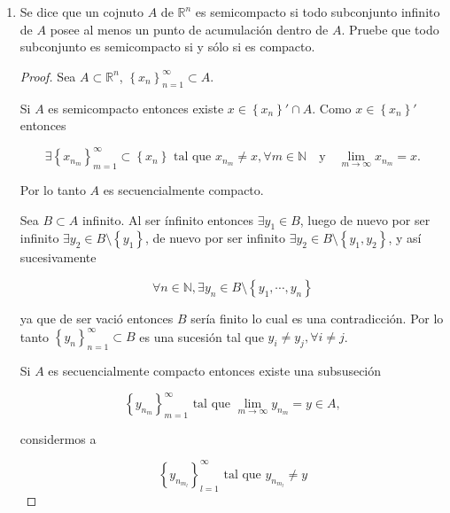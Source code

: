 \documentclass[letterpaper]{article}
\theoremstyle{definition}
\theoremstyle{lemathm}
\theoremstyle{lemathm}
\theoremstyle{lemathm}
\theoremstyle{lemademthm}
\newcommand{\limtoinf}[1]{\lim_{#1\to\infty}}
\newcommand{\Txty}{\quad\text{y}\quad}
\newcommand{\pars}[1]{\left( #1 \right) }
\newcommand{\norm}[1]{\left\lVert#1\right\rVert}
\newcommand{\set}[1]{\left \{ #1 \right\} }
\newcommand{\NN}{\mathbb{N}}
\newcommand{\RR}{\mathbb{R}}
\newcommand{\1}{\mathbbm{1}}
\begin{document}
\begin{enumerate}
\begin{proof}
			Si $y \in \bigcap_{n=1}^{\infty} \overline{B}\pars{x_n,r_n}, y\neq x$ entonces $\norm{y-x} > 0$. Como $\limtoinf{n} r_n = 0$ entonces $\exists n\in N$ tal que $\norm{x-y} > 2r_n$, luego

			\[2r_n < \norm{x-y} < \norm{x-x_n} + \norm{x_n-y} < r_n + \norm{x_n-y},\]

			es decir $r_n < \norm{x_n-y}$, por lo que $y\not\in\overline{B}\pars{x_n,r_n}$ lo cual es una contradicción, por lo tanto concluimos que

			\[x = \bigcap_{n=1}^{\infty} \overline{B}\pars{x_n,r_n}.\]

		\end{proof}

		\item Se dice que un cojnuto $A$ de $\RR^n$ es semicompacto si todo subconjunto infinito de $A$ posee al menos un punto de acumulación dentro de $A$. Pruebe que todo subconjunto es semicompacto si y sólo si es compacto.
		
		\begin{proof}
			Sea $A\subset \RR^n$, $\set{x_n}_{n=1}^{\infty} \subset A$.
			
			Si $A$ es semicompacto entonces existe $x \in \set{x_n}'\cap A$. Como $x\in \set{x_n}'$ entonces
			
			\[\exists \set{x_{n_m}}_{m=1}^{\infty} \subset \set{x_n}\text{ tal que }x_{n_m}\neq x, \forall m\in\NN \Txty \limtoinf{m} x_{n_m} = x.\]
			
			Por lo tanto $A$ es secuencialmente compacto.

			Sea $B\subset A$ infinito. Al ser ínfinito entonces $\exists y_1\in B$, luego de nuevo por ser infinito $\exists y_2\in B\setminus\set{y_1}$, de nuevo por ser infinito $\exists y_2\in B\setminus\set{y_1,y_2}$, y así sucesivamente 
			
			\[\forall n\in\NN, \exists y_n\in B\setminus\set{y_1,\cdots,y_n}\]
			
			ya que de ser vació entonces $B$ sería finito lo cual es una contradicción. Por lo tanto $\set{y_n}_{n=1}^{\infty}\subset B$ es una sucesión tal que $y_i \neq y_j, \forall i \neq j$. 

			Si $A$ es secuencialmente compacto entonces existe una subsuseción
			
			\[\set{y_{n_m}}_{m=1}^{\infty} \text{ tal que } \limtoinf{m} y_{n_m} = y \in A,\]
			
			considermos a 
			
			\[\set{y_{n_{m_l}}}_{l=1}^{\infty}\text{ tal que }y_{n_{m_l}} \neq y\]
			

\end{proof}
\end{enumerate}
\end{document}
